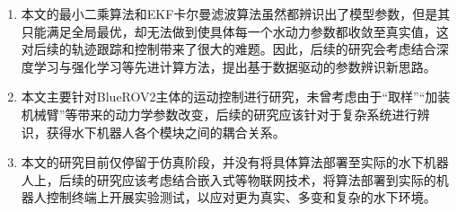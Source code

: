 \begin{enumerate}
    \item 本文的最小二乘算法和EKF卡尔曼滤波算法虽然都辨识出了模型参数，但是其只能满足全局最优，却无法做到使具体每一个水动力参数都收敛至真实值，这对后续的轨迹跟踪和控制带来了很大的难题。因此，后续的研究会考虑结合深度学习与强化学习等先进计算方法，提出基于数据驱动的参数辨识新思路。
    \item 本文主要针对BlueROV2主体的运动控制进行研究，未曾考虑由于“取样”“加装机械臂”等带来的动力学参数改变，后续的研究应该针对于复杂系统进行辨识，获得水下机器人各个模块之间的耦合关系。
    \item 本文的研究目前仅停留于仿真阶段，并没有将具体算法部署至实际的水下机器人上，后续的研究应该考虑结合嵌入式等物联网技术，将算法部署到实际的机器人控制终端上开展实验测试，以应对更为真实、多变和复杂的水下环境。
\end{enumerate}
